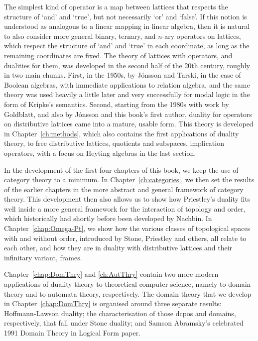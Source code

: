 The simplest kind of operator is a map between lattices that respects the structure of `and' and `true', but not necessarily `or' and `false'. If this notion is understood as analogous to a linear mapping in linear algebra, then it is natural to also consider more general binary, ternary, and $n$-ary operators on lattices, which respect the structure of `and' and `true' in each coordinate, as long as the remaining coordinates are fixed. The theory of lattices with operators, and dualities for them, was developed in the second half of the 20th century, roughly in two main chunks. First, in the 1950s, by J\'onsson and Tarski, in the case of Boolean algebras, with immediate  applications to relation algebra, and the same theory was used heavily a little later and very successfully for modal logic in the form of Kripke's semantics. Second, starting from the 1980s with work by Goldblatt, and also by J\'onsson and this book's first author, duality for operators on distributive lattices came into a mature, usable form. This theory is developed in Chapter~\ref{ch:methods}, which also contains the first applications of duality theory, to free distributive lattices, quotients and subspaces, implication operators, with a focus on Heyting algebras in the last section.

In the development of the first four chapters of this book, we keep the use of category theory to a minimum. In Chapter~\ref{ch:categories}, we then set the results of the earlier chapters in the more abstract and general framework of category theory. This development then also allows us to show how Priestley's duality fits well inside a more general framework for the interaction of topology and order, which historically had shortly before been developed by Nachbin. In Chapter~\ref{chap:Omega-Pt}, we show how the various classes of topological spaces with and without order, introduced by Stone, Priestley and others, all relate to each other, and how they are in duality with distributive lattices and their infinitary variant, frames.

Chapter~\ref{chap:DomThry} and \ref{ch:AutThry} contain two more modern applications of duality theory to theoretical computer science, namely to domain theory and to automata theory, respectively.
The domain theory that we develop in Chapter~\ref{chap:DomThry} is organised around three separate results: Hoffmann-Lawson duality; the characterisation of those dcpos and domains, respectively, that fall under Stone duality; and Samson Abramsky's celebrated 1991 Domain Theory in Logical Form paper. 

